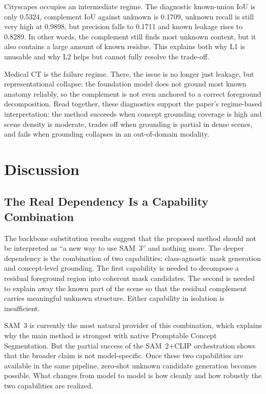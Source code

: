 \documentclass[a4paper,fleqn]{cas-dc}
\newcommand{\samthree}{SAM~3}
\newcommand{\samtwo}{SAM~2}
\newcommand{\clip}{CLIP}
\begin{document}
Cityscapes occupies an intermediate regime. The diagnostic known-union IoU is only 0.5324, complement IoU against unknown is 0.1709, unknown recall is still very high at 0.9898, but precision falls to 0.1711 and known leakage rises to 0.8289. In other words, the complement still finds most unknown content, but it also contains a large amount of known residue. This explains both why L1 is unusable and why L2 helps but cannot fully resolve the trade-off.

Medical CT is the failure regime. There, the issue is no longer just leakage, but representational collapse: the foundation model does not ground most known anatomy reliably, so the complement is not even anchored to a correct foreground decomposition. Read together, these diagnostics support the paper's regime-based interpretation: the method succeeds when concept grounding coverage is high and scene density is moderate, trades off when grounding is partial in dense scenes, and fails when grounding collapses in an out-of-domain modality.

\section{Discussion}
\label{sec:discussion}

\subsection{The Real Dependency Is a Capability Combination}
\label{sec:discussion:capability}

The backbone substitution results suggest that the proposed method should not be interpreted as ``a new way to use \samthree{}'' and nothing more. The deeper dependency is the combination of two capabilities: class-agnostic mask generation and concept-level grounding. The first capability is needed to decompose a residual foreground region into coherent mask candidates. The second is needed to explain away the known part of the scene so that the residual complement carries meaningful unknown structure. Either capability in isolation is insufficient.

\samthree{} is currently the most natural provider of this combination, which explains why the main method is strongest with native Promptable Concept Segmentation. But the partial success of the \samtwo{}+\clip{} orchestration shows that the broader claim is not model-specific. Once these two capabilities are available in the same pipeline, zero-shot unknown candidate generation becomes possible. What changes from model to model is how cleanly and how robustly the two capabilities are realized.
\end{document}

